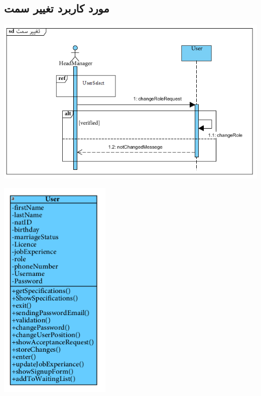 \newpage
\vspace{2cm}
\subsection*{مورد کاربرد تغییر سمت}
\vspace{2cm}
\begin{center}
\includegraphics[width=\textwidth]{SequenceDiagrams/8.png}
\end{center}

\newpage
\vspace{2cm}
\begin{center}
\includegraphics[width=0.4\textwidth]{SequenceClasses/8.png}
\end{center}

\newpage
\vspace{2cm}
